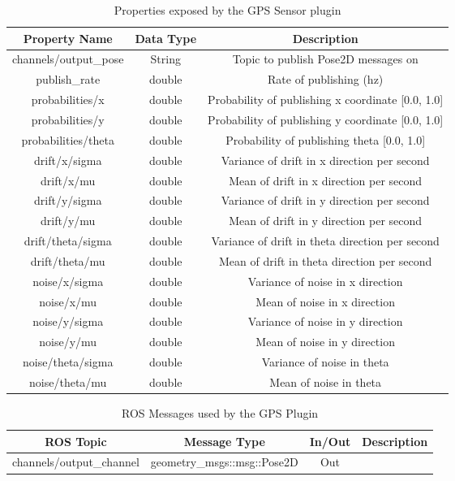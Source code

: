 \begin{itemize}
\begin{table}[h!]
	\centering
	\caption{Properties exposed by the GPS Sensor plugin}
	\label{tab:gps_props}
	\begin{tabular}{c|c|c}
	Property Name & Data Type & Description\\ \hline \hline
	channels/output\_pose & String & Topic to publish Pose2D messages on\\ \hline
	publish\_rate & double & Rate of publishing (hz)\\ \hline
	probabilities/x & double & Probability of publishing x coordinate [0.0, 1.0]\\ \hline
	probabilities/y & double & Probability of publishing y coordinate [0.0, 1.0]\\ \hline
	probabilities/theta & double & Probability of publishing theta [0.0, 1.0]\\ \hline
	drift/x/sigma & double & Variance of drift in x direction per second\\ \hline
	drift/x/mu & double & Mean of drift in x direction per second\\ \hline
	drift/y/sigma & double & Variance of drift in y direction per second\\ \hline
	drift/y/mu & double & Mean of drift in y direction per second\\ \hline
	drift/theta/sigma & double & Variance of drift in theta direction per second\\ \hline
	drift/theta/mu & double & Mean of drift in theta direction per second\\ \hline
	noise/x/sigma & double & Variance of noise in x direction\\ \hline
	noise/x/mu & double & Mean of noise in x direction\\ \hline
	noise/y/sigma & double & Variance of noise in y direction\\ \hline
	noise/y/mu & double & Mean of noise in y direction\\ \hline
	noise/theta/sigma & double & Variance of noise in theta\\ \hline
	noise/theta/mu & double & Mean of noise in theta
	\end{tabular}
\end{table}
\begin{table}[h!]
	\centering
	\caption{ROS Messages used by the GPS Plugin}
	\label{tab:gps_msgs}
	\begin{tabular}{c|c|c|c}
	ROS Topic & Message Type & In/Out & Description\\ \hline \hline
	channels/output\_channel & geometry\_msgs::msg::Pose2D & Out & \makecell{The 2D Pose message containing x, y, and theta}
	\end{tabular}
\end{table}

\end{itemize}
